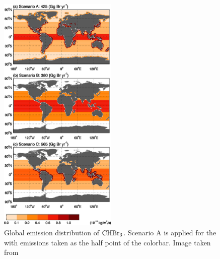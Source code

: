 \begin{figure}
    \centering
    \includegraphics[width = 0.5\textwidth]{Chapter3_Theory_ocean_hetReact/images/liang_etal_2010.png}
    \caption{Global emission distribution of $\mathrm{CHBr_3}$. Scenario A is applied for the  with emissions taken as the half point of the colorbar. Image taken from \cite{Liang2010}}
    \label{fig:Liang2010}
\end{figure}